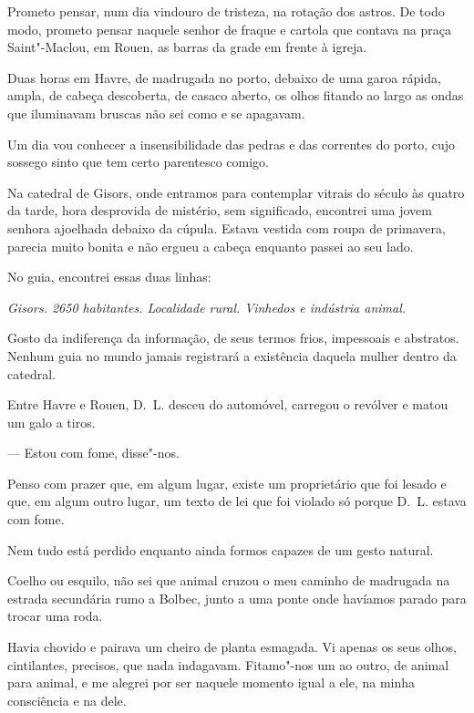Prometo pensar, num dia vindouro de tristeza, na rotação dos astros. De
todo modo, prometo pensar naquele senhor de fraque e cartola que
contava na praça Saint"-Maclou, em Rouen, as barras da grade em frente à
igreja.

\asterisc

Duas horas em Havre, de madrugada no porto, debaixo de uma garoa
rápida, ampla, de cabeça descoberta, de casaco aberto, os olhos fitando
ao largo as ondas que iluminavam bruscas não sei como e se apagavam.

Um dia vou conhecer a insensibilidade das pedras e das correntes do
porto, cujo sossego sinto que tem certo parentesco comigo.

\asterisc

Na catedral de Gisors, onde entramos para contemplar vitrais do
século  às quatro da tarde, hora desprovida de mistério, sem
significado, encontrei uma jovem senhora ajoelhada debaixo da
cúpula. Estava vestida com roupa de primavera, parecia muito bonita e
não ergueu a cabeça enquanto passei ao seu lado.

No guia, encontrei essas duas linhas:

\emph{Gisors. 2650 habitantes. Localidade rural. Vinhedos e indústria
animal.}

Gosto da indiferença da informação, de seus termos frios, impessoais e
abstratos. Nenhum guia no mundo jamais registrará a existência daquela
mulher dentro da catedral.

\asterisc

Entre Havre e Rouen, D.~L. desceu do automóvel, carregou o revólver e
matou um galo a tiros.

--- Estou com fome, disse"-nos.

Penso com prazer que, em algum lugar, existe um proprietário que foi
lesado e que, em algum outro lugar, um texto de lei que foi violado só
porque D.~L. estava com fome.

Nem tudo está perdido enquanto ainda formos capazes de um gesto natural.

\asterisc

Coelho ou esquilo, não sei que animal cruzou o meu caminho de
madrugada na estrada secundária rumo a Bolbec, junto a uma ponte onde
havíamos parado para trocar uma roda.

Havia chovido e pairava um cheiro de planta esmagada. Vi apenas os seus
olhos, cintilantes, precisos, que nada indagavam. Fitamo"-nos um ao
outro, de animal para animal, e me alegrei por ser naquele momento
igual a ele, na minha consciência e na dele.


